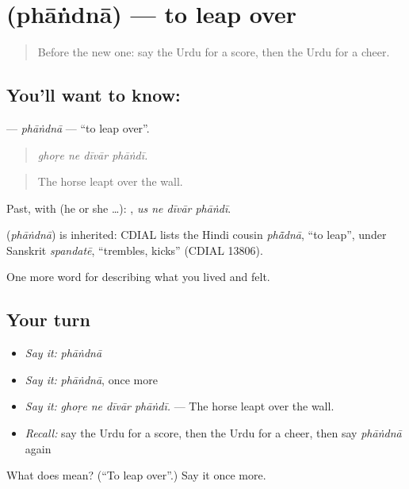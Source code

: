 \section[\texorpdfstring{\ur{پھاندنا} (phāṅdnā)}{پھاندنا (phāṅdnā)}]{ (phāṅdnā) — to leap over}

\label{lesson:UR-C523-phandna}



\begin{quote}
Before the new one: say the Urdu for a score, then the Urdu for a cheer.
\end{quote}

\subsection*{You'll want to know: }
\textbf{} — \emph{phāṅdnā} — \textquotedblleft{}to leap over\textquotedblright{}.

\begin{quote}
   
\end{quote}

\begin{quote}
\emph{ghoṛe ne dīvār phāṅdī.}
\end{quote}

\begin{quote}
The horse leapt over the wall.
\end{quote}

Past, with  (he or she …):    , \emph{us ne dīvār phāṅdī}.

\begin{cousinweb}
\textbf{} (\emph{phāṅdnā}) is inherited: CDIAL lists the Hindi cousin \emph{phā̃dnā}, \textquotedblleft{}to leap\textquotedblright{}, under Sanskrit \emph{spandatē}, \textquotedblleft{}trembles, kicks\textquotedblright{} (CDIAL 13806).
\end{cousinweb}

\begin{grammarlens}[title={What you've built}]
One more word for describing what you lived and felt.
\end{grammarlens}

\subsection*{Your turn}
\begin{itemize}
\raggedright
  \item \emph{Say it:} \emph{phāṅdnā}
  \item \emph{Say it:} \emph{phāṅdnā}, once more
  \item \emph{Say it:} \emph{ghoṛe ne dīvār phāṅdī.} — The horse leapt over the wall.
  \item \emph{Recall:} say the Urdu for a score, then the Urdu for a cheer, then say \emph{phāṅdnā} again
\end{itemize}

\begin{tcolorbox}[breakable,colback=teal!4,colframe=teal!35!black,title={Before you move on}]
What does  mean? (\textquotedblleft{}To leap over\textquotedblright{}.) Say it once more.
\end{tcolorbox}
